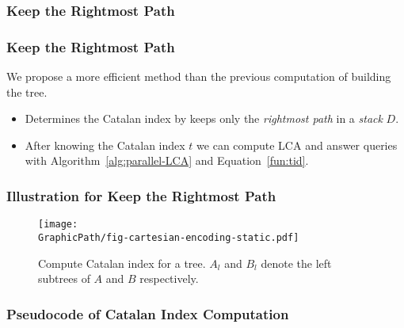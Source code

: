\subsubsection{Keep the Rightmost Path}
\begin{frame}
	\frametitle{Keep the Rightmost Path}
	We propose a more efficient method than the previous computation of
	building the tree.

	\begin{itemize}
		\setlength\itemsep{1em}
		\item 
			Determines the Catalan index by keeps only the {\em
			rightmost path} in a {\em stack} $D$.
		\item
			After knowing the Catalan index $t$ we can compute LCA and
			answer queries with Algorithm~\ref{alg:parallel-LCA} and
			Equation~\ref{fun:tid}.
	\end{itemize}
\end{frame}

\begin{withoutheadline}
\begin{frame}
	\frametitle{Illustration for Keep the Rightmost Path}
	\begin{center}
		\scalebox{1} { \begin{minipage}{\textwidth}
			\begin{figure}[!thb]
			  \centering
			  \texttt{[image: \\GraphicPath/fig-cartesian-encoding-static.pdf]}
			  \caption{Compute Catalan index for a tree.  $A_l$ and $B_l$ denote
			    the left subtrees of $A$ and $B$ respectively.}
			  \label{fig:fig-cartesian-encoding-static}
			\end{figure}
			\end{minipage}
		}
	\end{center}
\end{frame}
\end{withoutheadline}

\begin{withoutheadline}
\begin{frame}
	\frametitle{Pseudocode of Catalan Index Computation}
	\begin{center}
		\scalebox{0.7} { \begin{minipage}{\textwidth}
			
			\end{minipage}
		}
	\end{center}
\end{frame}
\end{withoutheadline}

